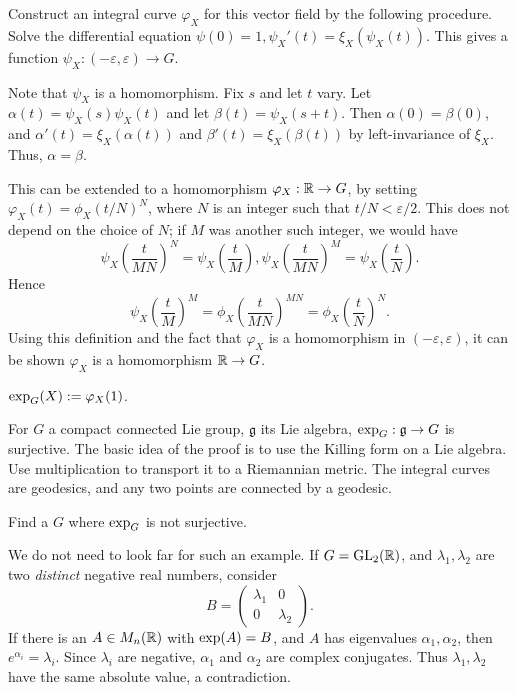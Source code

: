 Construct an integral curve  $\varphi_X$ for this vector field by the following 
procedure. Solve the  differential equation
$\psi(0) = 1, \psi_X'(t)
= \xi_X(\psi_X(t))$. This gives a 
function $\psi_X : (-\varepsilon, \varepsilon) \rightarrow G$.

Note that $\psi_X$ is a homomorphism. Fix $s$ and let $t$ vary. Let
$\alpha(t) = \psi_X(s) \psi_X(t)$ and let $\beta(t) = \psi_X(s + t)$. Then
$\alpha(0) = \beta(0)$, and $\alpha'(t) = \xi_X(\alpha(t))$ and
$\beta'(t) = \xi_X(\beta(t))$ by left-invariance of $\xi_X$. Thus,
$\alpha = \beta$.

This can be extended to a homomorphism $\varphi_X : \mathbb{R} \rightarrow G$,
by setting $\varphi_X(t) = \phi_X(t/N)^N$, where $N$ is an integer such that
$t/N < \varepsilon/2$. This does not depend on the choice of $N$; if $M$ was
another such integer, we would have
\[ \psi_X\left(\dfrac{t}{MN}\right)^N = \psi_X\left(\dfrac{t}{M}\right), 
  \psi_X\left(\dfrac{t}{MN}\right)^M = \psi_X\left(\dfrac{t}{N}\right). \]
Hence \[ \psi_X\left(\dfrac{t}{M}\right)^M
 = \phi_X\left(\dfrac{t}{MN}\right)^{MN}
 = \phi_X\left(\dfrac{t}{N}\right)^N. \]
Using this definition and the fact that $\varphi_X$ is a homomorphism in
$(-\varepsilon, \varepsilon)$, it can be shown $\varphi_X$ is a homomorphism
$\mathbb{R} \rightarrow G$.

\begin{defn}
$\operatorname{exp}_G(X) := \varphi_X(1)$.
\end{defn}

\begin{rmk}
For $G$ a compact connected Lie group, $\mathfrak{g}$ its Lie algebra,
$\operatorname{exp}_G: \mathfrak{g} \rightarrow G$ is surjective. The basic idea of the
proof is to use the Killing form on a Lie algebra. Use multiplication to 
transport it to a Riemannian metric. The integral curves are geodesics, and any
two points are connected by a geodesic.
\end{rmk}

\begin{ex}
Find a $G$ where $\operatorname{exp}_G$ is not surjective.

We do not need to look far for such an example. If $G = \mathrm{GL}_{2}({\mathbb{R}})$, and
$\lambda_1, \lambda_2$ are two \emph{distinct} negative real numbers, consider
\[B = \left(\begin{matrix}
  \lambda_1 & 0 \\
  0 & \lambda_2
\end{matrix}\right). \]
If there is an $A \in M_n(\mathbb{R})$ with $\operatorname{exp}(A) = B$, and $A$ has
eigenvalues $\alpha_1, \alpha_2$, then $e^{\alpha_i} = \lambda_i$. Since
$\lambda_i$ are negative, $\alpha_1$ and $\alpha_2$ are complex conjugates. Thus
$\lambda_1, \lambda_2$ have the same absolute value, a contradiction.
\end{ex}

